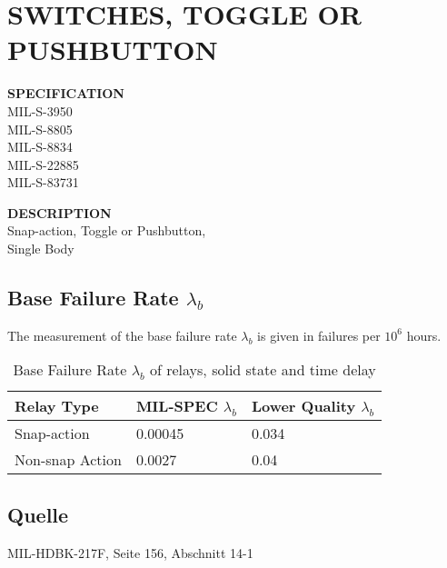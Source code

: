 \section{SWITCHES, TOGGLE OR PUSHBUTTON}

\begin{minipage}[t]{0.29\textwidth}
    \textbf{SPECIFICATION}\\
    MIL-S-3950\\MIL-S-8805\\MIL-S-8834\\MIL-S-22885\\MIL-S-83731
\end{minipage}
\begin{minipage}[t]{0.7\textwidth}
    \textbf{DESCRIPTION}\\
    Snap-action, Toggle or Pushbutton,\\Single Body
\end{minipage}

\subsection{Base Failure Rate $\lambda_b$}
The measurement of the base failure rate $\lambda_b$ is given in failures per $10^6$ hours.
\begin{table}[ht]
{\centering

\begin{tabular}{|p{5cm}|p{3cm}|p{3cm}|}
    \hline
    \textbf{Relay Type} & \textbf{MIL-SPEC $\lambda_b$} & \textbf{Lower Quality $\lambda_b$}\\
    \hline
    Snap-action & 0.00045 & 0.034 \\
    \hline
    Non-snap Action & 0.0027 & 0.04 \\
    \hline
\end{tabular}

\caption{Base Failure Rate $\lambda_b$ of relays, solid state and time delay}

\label{tab:bfr_switches_toggle_or_pushbutton}
\par}
\end{table}
\subsection*{Quelle}
MIL-HDBK-217F, Seite 156, Abschnitt 14-1